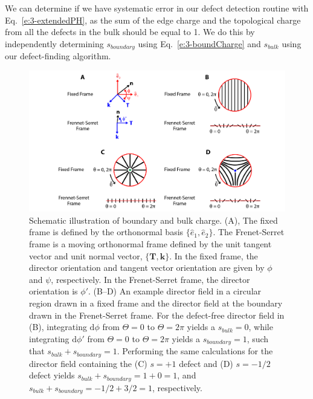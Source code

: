 We can determine if we have systematic error in our defect detection routine with Eq.~\ref{e:3-extendedPH}, as the sum of the edge charge and the topological charge from all the defects in the bulk should be equal to 1.
We do this by independently determining $s_{boundary}$ using Eq.~\ref{e:3-boundCharge} and $s_{bulk}$ using our defect-finding algorithm.
\begin{figure}
  \centering
  \includegraphics{figures/C3/Ch3-Figs_EdgeChargeEx.png}
  \caption{Schematic illustration of boundary and bulk charge.
  (A), The fixed frame is defined by the orthonormal basis $\{\hat{e}_1, \hat{e}_2 \}$.
  The Frenet-Serret frame is a moving orthonormal frame defined by the unit tangent vector and unit normal vector, $\{\mathbf{T}, \mathbf{k}\}$.
  In the fixed frame, the director orientation and tangent vector orientation are given by $\phi$ and $\psi$, respectively.
  In the Frenet-Serret frame, the director orientation is $\phi'$.
  (B--D) An example director field in a circular region drawn in a fixed frame and the director field at the boundary drawn in the Frenet-Serret frame.
  For the defect-free director field in (B), integrating $\textrm{d}\phi$ from $\Theta = 0$ to $\Theta = 2\pi$ yields a $s_{bulk} = 0$, while integrating $\textrm{d}\phi'$ from $\Theta = 0$ to $\Theta = 2\pi$ yields a $s_{boundary} = 1$, such that $s_{bulk} + s_{boundary}=1$.
  Performing the same calculations for the director field containing the (C) $s = +1$ defect and (D) $s = -1/2$ defect yields $s_{bulk} + s_{boundary}= 1 + 0= 1$, and $s_{bulk} + s_{boundary}= -1/2 + 3/2 = 1$, respectively.}\label{f:3-EdgeChargeEx}
\end{figure}

